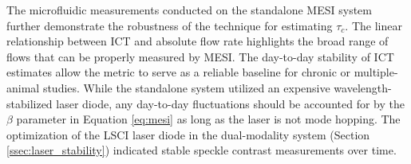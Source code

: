 The microfluidic measurements conducted on the standalone MESI system further demonstrate the robustness of the technique for estimating $\tau_c$. The linear relationship between ICT and absolute flow rate highlights the broad range of flows that can be properly measured by MESI. The day-to-day stability of ICT estimates allow the metric to serve as a reliable baseline for chronic or multiple-animal studies. While the standalone system utilized an expensive wavelength-stabilized laser diode, any day-to-day fluctuations should be accounted for by the $\beta$ parameter in Equation \ref{eq:mesi} as long as the laser is not mode hopping. The optimization of the LSCI laser diode in the dual-modality system (Section \ref{ssec:laser_stability}) indicated stable speckle contrast measurements over time.



